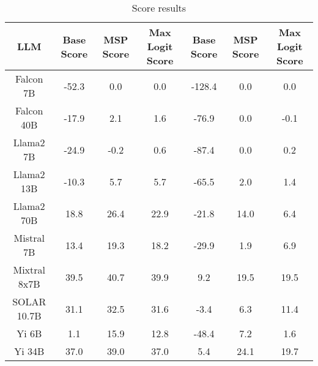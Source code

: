 \renewcommand\arraystretch{1.2}
\begin{table*}
\centering
\begin{tabular}{c|c|c|c|c|c|c}
LLM & Base Score & MSP Score & Max Logit Score & Base Score & MSP Score & Max Logit Score\\ \hline
Falcon 7B & -52.3 & 0.0 & 0.0 & -128.4 & 0.0 & 0.0\\
Falcon 40B & -17.9 & 2.1 & 1.6 & -76.9 & 0.0 & -0.1\\
Llama2 7B & -24.9 & -0.2 & 0.6 & -87.4 & 0.0 & 0.2\\
Llama2 13B & -10.3 & 5.7 & 5.7 & -65.5 & 2.0 & 1.4\\
Llama2 70B & 18.8 & 26.4 & 22.9 & -21.8 & 14.0 & 6.4\\
Mistral 7B & 13.4 & 19.3 & 18.2 & -29.9 & 1.9 & 6.9\\
Mixtral 8x7B & 39.5 & 40.7 & 39.9 & 9.2 & 19.5 & 19.5\\
SOLAR 10.7B & 31.1 & 32.5 & 31.6 & -3.4 & 6.3 & 11.4\\
Yi 6B & 1.1 & 15.9 & 12.8 & -48.4 & 7.2 & 1.6\\
Yi 34B & 37.0 & 39.0 & 37.0 & 5.4 & 24.1 & 19.7\\
\hline
\end{tabular}
\caption{Score results}
\end{table*}
\label{tab:score}
